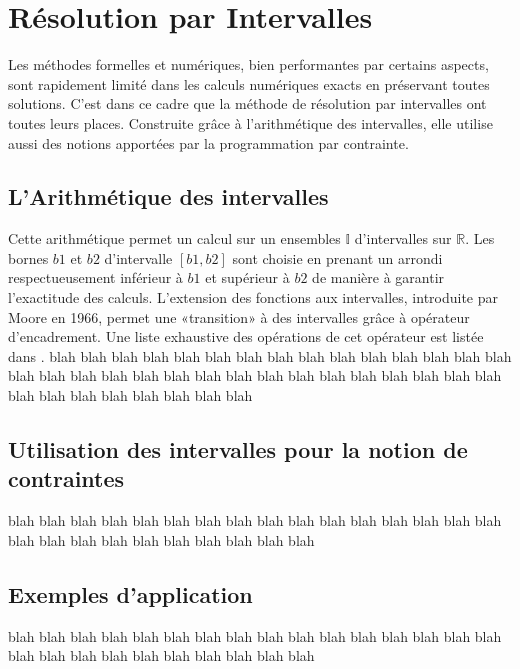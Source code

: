 \section{Résolution par Intervalles}
Les méthodes formelles et numériques, bien performantes par certains aspects, sont rapidement limité dans les calculs numériques exacts en préservant toutes solutions. C'est dans ce cadre que la méthode de résolution par intervalles ont toutes leurs places. Construite grâce à l'arithmétique des intervalles, elle utilise aussi des notions apportées par la programmation par contrainte.
 
\subsection{L'Arithmétique des intervalles}
Cette arithmétique permet un calcul sur un ensembles $\mathbb{I}$ d'intervalles sur $\mathbb{R}$. Les bornes $b1$ et $b2$ d'intervalle $[b1,b2]$ sont choisie en prenant un arrondi respectueusement inférieur à $b1$ et supérieur à $b2$ de manière à garantir l'exactitude des calculs. L'extension des fonctions aux intervalles, introduite par Moore en 1966, permet une «transition» à des intervalles grâce à opérateur d'encadrement. Une liste exhaustive des opérations de cet opérateur est listée dans \cite{Jermann}.  
  blah blah blah blah blah blah blah blah blah blah blah blah blah blah blah blah blah blah blah blah blah blah blah blah blah blah blah blah blah blah blah blah blah blah blah blah blah blah blah
\subsection{Utilisation des intervalles pour la notion de contraintes}

 blah blah blah blah blah blah blah blah blah blah blah blah blah blah blah blah blah blah blah blah blah blah blah blah blah blah


\subsection{Exemples d'application}
 blah blah blah blah blah blah blah blah blah blah blah blah blah blah blah blah blah blah blah blah blah blah blah blah blah blah

